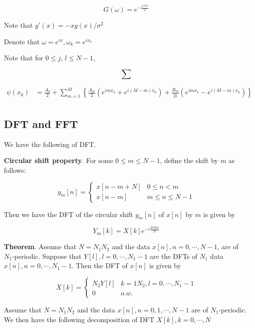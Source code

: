 \documentclass[12pt]{article}
\theoremstyle{nonumberbreak}
\begin{document}
$$
G(\omega) = e^{-\frac{\omega^2 \sigma^2}{2}}
$$

Note that $g'(x) = -xg(x)/\sigma^2$



Denote that $\omega = e^{ix}, \omega_k = e^{ix_k}$

Note that for $0 \le j$, $l \le N-1$, 

$$
\sum
$$


$$
\begin{aligned}
\psi(x_k) &= \frac{A_0}{2} + \sum_{m=1}^M \left\{ \frac{A_m}{2} \left( e^{imx_k} + e^{i(M-m)x_k} \right) + \frac{B_m}{2i} \left( e^{imx_k} - e^{i(M-m)x_k} \right) \right\} \\[8pt]
\end{aligned}
$$




\subsection*{DFT and FFT}


We have the following  of DFT. 



\begin{theorem}
\textbf{Circular shift property}. For some $0 \le m \le N-1$, define the shift by $m$ as follows:

$$
y_m[n] = \begin{cases} 
x[n-m+N] & 0 \le n < m \\
x[n-m] & m \le n \le N-1
\end{cases}
$$

Then we have the DFT of the circular shift $y_m[n]$ of $x[n]$ by $m$ is given by

$$
Y_m[k] = X[k] e^{-i \frac{2\pi km}{N}}
$$
\end{theorem}




\begin{theorem}
\textbf{Theorem}. Assume that $N=N_1N_2$ and the data $x[n], n=0,\cdots,N-1$, are of $N_1$-periodic. Suppose that $Y[l], l=0,\cdots,N_1-1$ are the DFTs of $N_1$ data $x[n], n=0,\cdots,N_1-1$. Then the DFT of $x[n]$ is given by

$$
X[k] = \begin{cases} 
N_2 Y[l] & k=1N_2, l=0,\cdots,N_1-1 \\
0 & o.w.
\end{cases}
$$
\end{theorem}


Assume that $N=N_1N_2$ and the data $x[n], n=0,1,\cdots,N-1$ are of $N_1$-periodic. We then have the following decomposition of DFT $X[k], k=0,\cdots,N$
\end{document}
